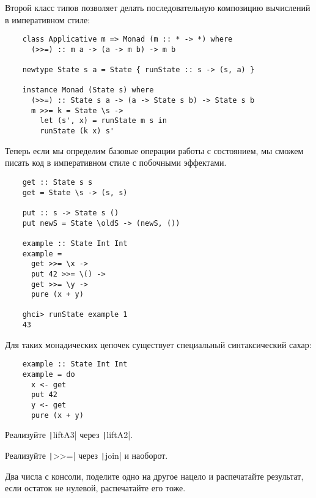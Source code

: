 Второй класс типов позволяет делать последовательную композицию вычислений в императивном стиле:
\begin{verbatim}
    class Applicative m => Monad (m :: * -> *) where
      (>>=) :: m a -> (a -> m b) -> m b

    newtype State s a = State { runState :: s -> (s, a) }

    instance Monad (State s) where
      (>>=) :: State s a -> (a -> State s b) -> State s b
      m >>= k = State \s ->
        let (s', x) = runState m s in
        runState (k x) s'
\end{verbatim}

Теперь если мы определим базовые операции работы с состоянием, мы сможем писать код в императивном стиле с побочными эффектами.
\begin{verbatim}
    get :: State s s
    get = State \s -> (s, s)

    put :: s -> State s ()
    put newS = State \oldS -> (newS, ())

    example :: State Int Int
    example =
      get >>= \x ->
      put 42 >>= \() ->
      get >>= \y ->
      pure (x + y)

    ghci> runState example 1
    43
\end{verbatim}

Для таких монадических цепочек существует специальный синтаксический сахар:
\begin{verbatim}
    example :: State Int Int
    example = do
      x <- get
      put 42
      y <- get
      pure (x + y)
\end{verbatim}

\begin{task}
    Реализуйте \texttt|liftA3| через \texttt|liftA2|.
\end{task}

\begin{task}
    Реализуйте \texttt|>>=| через \texttt|join| и наоборот.
\end{task}

\begin{task}
    Два числа с консоли, поделите одно на другое нацело и распечатайте результат, если остаток не нулевой, распечатайте его тоже.
\end{task}
